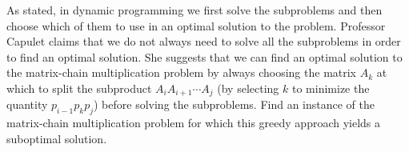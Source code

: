 As stated, in dynamic programming we first solve the subproblems and then 
choose which of them  to use in an optimal solution to the problem. 
Professor Capulet claims that we do not always need to solve all the subproblems 
in order to find an optimal solution. She suggests that we can find an optimal 
solution to the matrix-chain multiplication problem by always choosing the 
matrix $A_k$ at which to split the subproduct $A_iA_{i+1}\cdots A_j$
(by selecting $k$ to minimize the quantity $p_{i-1}p_kp_j$) before solving the 
subproblems. Find an instance of the matrix-chain multiplication problem 
for which this greedy approach yields a suboptimal solution.